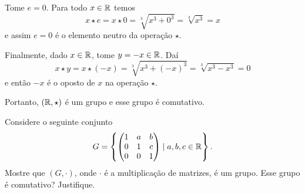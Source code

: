 \documentclass[12pt]{exam}
\begin{document}
    Tome $e = 0$. Para todo $x \in \mathbb{R}$ temos
    \[
        x\star e = x \star 0 = \sqrt[3]{x^3 + 0^3} = \sqrt[3]{x^3} = x
    \]
    e assim $e = 0$ é o elemento neutro da operação $\star$.

    Finalmente, dado $x \in \mathbb{R}$, tome $y = -x \in \mathbb{R}$. Daí
    \[
        x \star y = x \star (-x) = \sqrt[3]{x^3 + (-x)^3} = \sqrt[3]{x^3 - x^3} = 0
    \]
    e então $-x$ é o oposto de $x$ na operação $\star$.

    Portanto, $(\mathbb{R}, \star)$ é um grupo e esse grupo é comutativo.
    \vspace{1cm}

    \questao Considere o seguinte conjunto
    \[
    G = \left\{\begin{pmatrix} 1 & a & b\\ 0 & 1 & c \\ 0 & 0 & 1\end{pmatrix} \mid a, b, c \in \mathbb{R}\right\}.
    \]
    Mostre que $(G, \cdot)$, onde $\cdot$ é a multiplicação de matrizes, é um grupo. Esse grupo é comutativo? Justifique.
\end{document}
